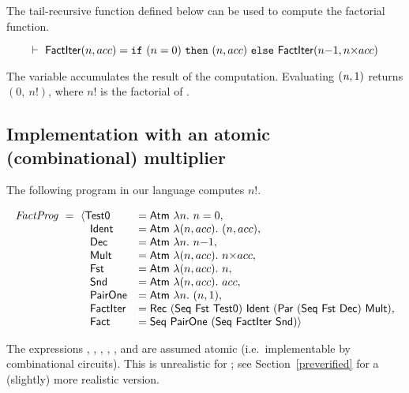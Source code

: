 \documentclass{llncs}
\begin{document}

The tail-recursive function  defined below can be used
to compute the factorial function.


\[
\vdash\ \mathsf{FactIter}(n,acc) = \texttt{if}~(n=0)~\texttt{then}~(n,acc)~\texttt{else}~\mathsf{FactIter}(n{-}1,n{\times}acc)
\]


\noindent The variable  accumulates the result of the
computation. 
Evaluating $(\mathit{n},1)$
returns $(0,~n!)$, where $n!$ is the factorial of .

\subsection{Implementation with an atomic (combinational) multiplier}\label{atomic}

The following program in our language computes $n!$.


$$
\begin{array}{ll}
\mathit{FactProg}~ =~ \langle \mathsf{Test0}    &= \mathsf{Atm}~\lambda n.~ n=0,\\
\phantom{FactProg~ = ~ \langle}
  \mathsf{Ident}    &= \mathsf{Atm}~\lambda (n,acc).~ (n,acc),\\
\phantom{FactProg~ = ~ \langle}
  \mathsf{Dec}      &= \mathsf{Atm}~\lambda n.~ n{-}1,\\
\phantom{FactProg~ = ~ \langle}
  \mathsf{Mult}     &= \mathsf{Atm}~\lambda (n,acc).~ n{\times}acc,\\
\phantom{FactProg~ = ~ \langle}
  \mathsf{Fst}      &= \mathsf{Atm}~\lambda (n,acc).~ n,\\
\phantom{FactProg~ = ~ \langle}
  \mathsf{Snd}      &= \mathsf{Atm}~\lambda (n,acc).~ acc,\\
\phantom{FactProg~ = ~ \langle}
  \mathsf{PairOne}  &= \mathsf{Atm}~\lambda n.~ (n,1),\\
\phantom{FactProg~ = ~ \langle}
  \mathsf{FactIter} &= \mathsf{Rec~(Seq~Fst~Test0)~Ident~(Par~(Seq~Fst~Dec)~Mult)},\\
\phantom{FactProg~ = ~ \langle}
  \mathsf{Fact}     &= \mathsf{Seq~PairOne~(Seq~FactIter~Snd)} \rangle
\end{array}
$$

\noindent The expressions , , , , ,  and
 are assumed atomic (i.e.~implementable by combinational circuits). This is unrealistic 
for ; see Section~\ref{preverified} for a (slightly) more realistic version.
\end{document}
